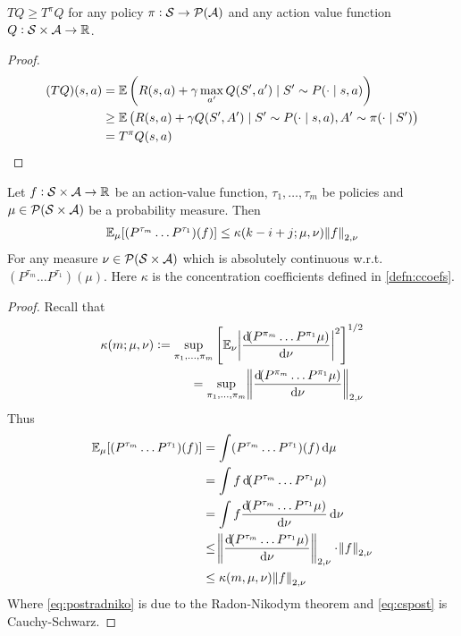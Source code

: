 
\begin{lem}\label{lem:tlemma}
  $T Q \geq T^\pi Q$ for any policy $\pi : \mathcal{S} \to \mathcal{P}(\mathcal{A})$
  and any action value function $Q: \mathcal{S} \times \mathcal{A} \to \mathbb{R}$.
\end{lem}
\begin{proof}
  \begin{align*}
    (TQ)(s, a) &= \mathbb{E} \left( R(s, a) + \gamma \max_{a'} Q(S', a')
    \mid S' \sim P(\cdot \mid s, a) \right)
    \\ &\geq \mathbb{E} \left( R(s, a) + \gamma Q(S', A')
    \mid S' \sim P(\cdot \mid s, a), A' \sim \pi(\cdot \mid S') \right)
    \\ &= T^\pi Q(s,a)
  \end{align*}
\end{proof}

\begin{lem}\label{lem:MRN}
  Let $f:\mathcal{S}\times\mathcal{A} \to \mathbb{R}$ be an action-value function,
  $\tau_1, \dots, \tau_m$ be policies
  and $\mu \in \mathcal{P}(\mathcal{S}\times\mathcal{A})$ be a probability measure.
  Then
  \begin{align*}
    \mathbb{E}_\mu [(P^{\tau_m} \dots P^{\tau_1})(f)]
    \leq \kappa(k - i + j; \mu, \nu) \norm{f}_{2,\nu}
  \end{align*}
  For any measure $\nu \in \mathcal{P}(\mathcal{S}\times\mathcal{A})$ which is
  absolutely continuous w.r.t. $(P^{\tau_m} \dots P^{\tau_1})(\mu)$.
	Here $\kappa$ is the concentration coefficients defined in \cref{defn:ccoefs}.
\end{lem}
\begin{proof}
  Recall that
  \begin{align*}
    \kappa(m; \mu, \nu) := \sup_{\pi_1, \dots, \pi_m} \left[
      \E_{\nu} \abs{\frac{\dif (P^{\pi_m}\dots P^{\pi_1}\mu)}{\dif \nu}}^2
      \right]^{1/2}
      \\ = \sup_{\pi_1, \dots, \pi_m}
      \norm{\frac{\dif (P^{\pi_m}\dots P^{\pi_1}\mu)}{\dif \nu}}_{2, \nu}
  \end{align*}
  Thus
  \begin{align}
    \E_\mu [(P^{\tau_m} \dots P^{\tau_1})(f)]
    &= \int (P^{\tau_m} \dots P^{\tau_1})(f) \dif \mu
    \\ &= \int f \dif (P^{\tau_m} \dots P^{\tau_1} \mu)
    \label{eq:preradniko}
    \\ &= \int f \frac{\dif(P^{\tau_m} \dots P^{\tau_1} \mu)}{\dif \nu} \dif \nu
    \label{eq:postradniko}
    \\ &\leq \norm{\frac{\dif(P^{\tau_m} \dots P^{\tau_1} \mu)}{\dif \nu}}_{2,\nu}
    \cdot \norm{f}_{2, \nu} \label{eq:cspost}
    \\ &\leq \kappa(m, \mu, \nu) \norm{f}_{2,\nu}
  \end{align}
  Where \cref{eq:postradniko} is due to the Radon-Nikodym theorem
  and \cref{eq:cspost} is Cauchy-Schwarz.
\end{proof}

